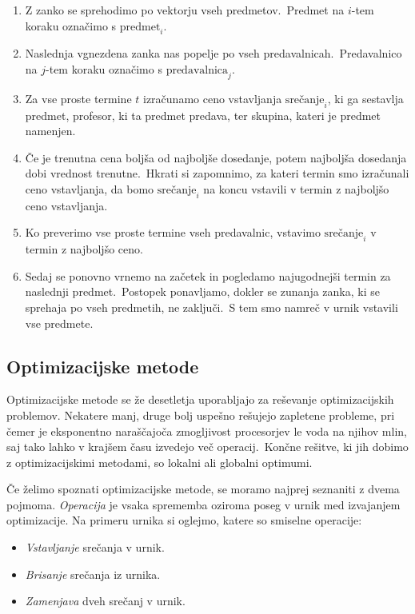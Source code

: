 \documentclass[a4paper,10pt]{article}
\begin{document}
\begin{enumerate}
   \item Z zanko se sprehodimo po vektorju vseh predmetov.\ Predmet na $i$-tem koraku
   označimo s $\text{predmet}_i$.

   \item Naslednja vgnezdena zanka nas popelje po vseh predavalnicah.\ Predavalnico na
   $j$-tem koraku označimo s $\text{predavalnica}_j$.

   \item Za vse proste termine $t$ izračunamo ceno vstavljanja
   $\text{srečanje}_i$, ki ga sestavlja predmet, profesor, ki ta predmet predava,
   ter skupina, kateri je predmet namenjen. 

   \item Če je trenutna cena boljša od najboljše dosedanje, potem najboljša dosedanja
   dobi vrednost trenutne.\ Hkrati si zapomnimo, za kateri termin smo izračunali ceno
   vstavljanja, da bomo $\text{srečanje}_i$ na koncu vstavili v termin z najboljšo
   ceno vstavljanja.

   \item Ko preverimo vse proste termine vseh predavalnic, vstavimo $\text{srečanje}_i$
   v termin z najboljšo ceno.

  \item Sedaj se ponovno vrnemo na začetek in pogledamo najugodnejši termin za naslednji
   predmet.\ Postopek ponavljamo, dokler se zunanja zanka, ki se sprehaja po vseh predmetih,
   ne zaključi.\ S tem smo namreč v urnik vstavili vse predmete.
\end{enumerate}
\subsection{Optimizacijske metode}

Optimizacijske metode se že desetletja uporabljajo za reševanje optimizacijskih problemov.
Nekatere manj, druge bolj uspešno rešujejo zapletene probleme, pri čemer je eksponentno
naraščajoča zmogljivost procesorjev le voda na njihov mlin, saj tako lahko v krajšem
času izvedejo več operacij.\ Končne rešitve, ki jih dobimo z optimizacijskimi metodami,
so lokalni ali globalni optimumi.

Če želimo spoznati optimizacijske metode, se moramo najprej seznaniti z dvema pojmoma.
\emph{Operacija} je vsaka sprememba oziroma poseg v urnik med izvajanjem optimizacije.
Na primeru urnika si oglejmo, katere so smiselne operacije:

   \begin{itemize}
   \item \emph{Vstavljanje} srečanja v urnik.
   \item \emph{Brisanje} srečanja iz urnika.
   \item \emph{Zamenjava} dveh srečanj v urnik.
\end{itemize}
\end{document}
